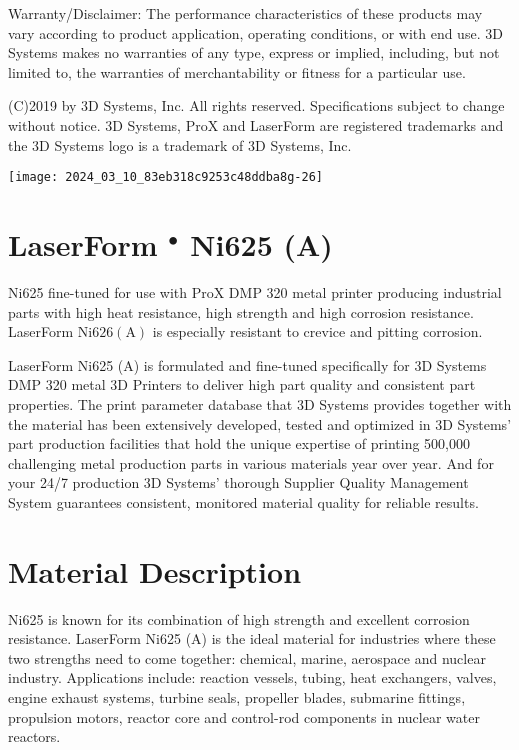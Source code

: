 \documentclass[10pt]{article}
\begin{document}
Warranty/Disclaimer: The performance characteristics of these products may vary according to product application, operating conditions, or with end use. 3D Systems makes no warranties of any type, express or implied, including, but not limited to, the warranties of merchantability or fitness for a particular use.

(C)2019 by 3D Systems, Inc. All rights reserved. Specifications subject to change without notice. 3D Systems, ProX and LaserForm are registered trademarks and the 3D Systems logo is a trademark of 3D Systems, Inc.

\begin{center}
\texttt{[image: 2024\_03\_10\_83eb318c9253c48ddba8g-26]}
\end{center}

\section*{LaserForm ${ }^{\bullet}$ Ni625 (A)}
Ni625 fine-tuned for use with ProX DMP 320 metal printer producing industrial parts with high heat resistance, high strength and high corrosion resistance. LaserForm $\mathrm{Ni626}(\mathrm{A})$ is especially resistant to crevice and pitting corrosion.

LaserForm Ni625 (A) is formulated and fine-tuned specifically for 3D Systems DMP 320 metal 3D Printers to deliver high part quality and consistent part properties. The print parameter database that 3D Systems provides together with the material has been extensively developed, tested and optimized in 3D Systems' part production facilities that hold the unique expertise of printing 500,000 challenging metal production parts in various materials year over year. And for your 24/7 production 3D Systems' thorough Supplier Quality Management System guarantees consistent, monitored material quality for reliable results.

\section*{Material Description}
Ni625 is known for its combination of high strength and excellent corrosion resistance. LaserForm Ni625 (A) is the ideal material for industries where these two strengths need to come together: chemical, marine, aerospace and nuclear industry. Applications include: reaction vessels, tubing, heat exchangers, valves, engine exhaust systems, turbine seals, propeller blades, submarine fittings, propulsion motors, reactor core and control-rod components in nuclear water reactors.
\end{document}
